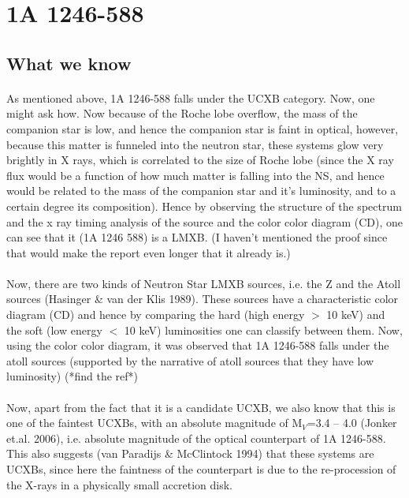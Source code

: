 \documentclass[a4paper,twoside]{report}
\numberwithin{equation}{section}
\begin{document}
\section{1A 1246-588}
\subsection{What we know}
\paragraph{}
As mentioned above, 1A 1246-588 falls under the UCXB category. Now, one might ask how. Now because of the Roche lobe overflow, the mass of the companion star is low, and hence the companion star is faint in optical, however, because this matter is funneled into the neutron star, these systems glow very brightly in X rays, which is correlated to the size of Roche lobe (since the X ray flux would be a function of how much matter is falling into the NS, and hence would be related to the mass of the companion star and it's luminosity, and to a certain degree its composition). Hence by observing the structure of the spectrum and the x ray timing analysis of the source and the color color diagram (CD), one can see that it (1A 1246 588) is a LMXB. (I haven't mentioned the proof since that would make the report even longer that it already is.)
\paragraph{}
Now, there are two kinds of Neutron Star LMXB sources, i.e. the Z and the Atoll sources (Hasinger \& van der Klis 1989). These sources have a characteristic color diagram (CD) and hence by comparing the hard (high energy $>$ 10 keV) and the soft (low energy $<$ 10 keV) luminosities one can classify between them. Now, using the color color diagram, it was observed that 1A 1246-588 falls under the atoll sources (supported by the narrative of atoll sources that they have low luminosity) (*find the ref*)
\paragraph{}
Now, apart from the fact that it is a candidate UCXB, we also know that this is one of the faintest UCXBs, with an absolute magnitude of M$_V$=3.4 -- 4.0 (Jonker et.al. 2006), i.e. absolute magnitude of the optical counterpart of 1A 1246-588. This also suggests (van Paradijs \& McClintock 1994) that these systems are UCXBs, since here the faintness of the counterpart is due to the re-procession of the X-rays in a physically small accretion disk. 
\end{document}
